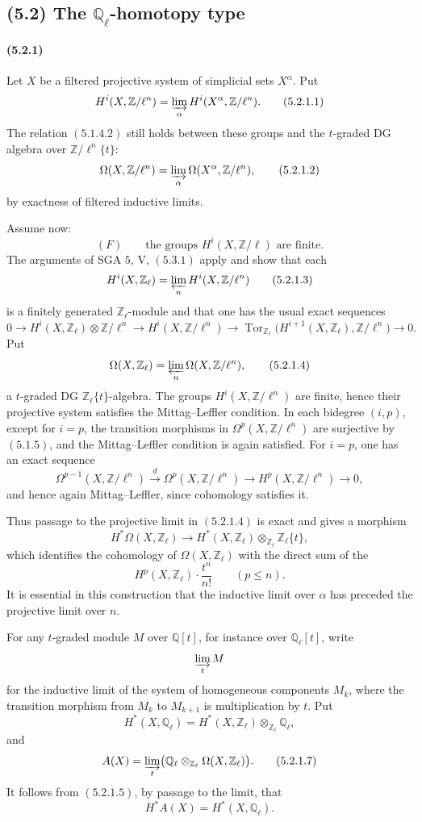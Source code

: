 \documentclass[11pt]{article}
\theoremstyle{remark}
\newcommand{\Ql}{\mathbb{Q}_\ell}
\newcommand{\ZZ}{\mathbb{Z}}
\newcommand{\QQ}{\mathbb{Q}}
\begin{document}
\subsection*{(5.2) The \(\mathbb Q_\ell\)-homotopy type}

\paragraph{(5.2.1)}
Let \(X\) be a filtered projective system of simplicial sets \(X^\alpha\).  Put
\[
H^i(X,\ZZ/\ell^n)=\varinjlim_\alpha H^i(X^\alpha,\ZZ/\ell^n). \tag{5.2.1.1}
\]
The relation \((5.1.4.2)\) still holds between these groups and the \(t\)-graded DG algebra over \(\ZZ/\ell^n\{t\}\):
\[
\Omega(X,\ZZ/\ell^n)=\varinjlim_\alpha \Omega(X^\alpha,\ZZ/\ell^n), \tag{5.2.1.2}
\]
by exactness of filtered inductive limits.

Assume now:
\[
(F)\qquad\text{the groups }H^i(X,\ZZ/\ell)\text{ are finite.}
\]
The arguments of SGA \(5\), V, \((5.3.1)\) apply and show that each
\[
H^i(X,\ZZ_\ell)=\varprojlim_n H^i(X,\ZZ/\ell^n) \tag{5.2.1.3}
\]
is a finitely generated \(\ZZ_\ell\)-module and that one has the usual exact sequences
\[
0\to H^i(X,\ZZ_\ell)\otimes\ZZ/\ell^n
\to H^i(X,\ZZ/\ell^n)
\to \operatorname{Tor}_{\ZZ_\ell}\bigl(H^{i+1}(X,\ZZ_\ell),\ZZ/\ell^n\bigr)\to 0.
\]
Put
\[
\Omega(X,\ZZ_\ell)=\varprojlim_n\Omega(X,\ZZ/\ell^n), \tag{5.2.1.4}
\]
a \(t\)-graded DG \(\ZZ_\ell\{t\}\)-algebra.  The groups \(H^i(X,\ZZ/\ell^n)\) are finite, hence their projective system satisfies the Mittag--Leffler condition.  In each bidegree \((i,p)\), except for \(i=p\), the transition morphisms in \(\Omega^p(X,\ZZ/\ell^n)\) are surjective by \((5.1.5)\), and the Mittag--Leffler condition is again satisfied.  For \(i=p\), one has an exact sequence
\[
\Omega^{p-1}(X,\ZZ/\ell^n)\xrightarrow{d}
\Omega^p(X,\ZZ/\ell^n)\longrightarrow H^p(X,\ZZ/\ell^n)\longrightarrow 0,
\]
and hence again Mittag--Leffler, since cohomology satisfies it.

Thus passage to the projective limit in \((5.2.1.4)\) is exact and gives a morphism
\[
H^*\Omega(X,\ZZ_\ell)\longrightarrow
H^*(X,\ZZ_\ell)\otimes_{\ZZ_\ell}\ZZ_\ell\{t\}, \tag{5.2.1.5}
\]
which identifies the cohomology of \(\Omega(X,\ZZ_\ell)\) with the direct sum of the
\[
H^p(X,\ZZ_\ell)\cdot \frac{t^n}{n!}
\qquad (p\le n).
\]
It is essential in this construction that the inductive limit over \(\alpha\) has preceded the projective limit over \(n\).

For any \(t\)-graded module \(M\) over \(\QQ[t]\), for instance over \(\Ql[t]\), write
\[
\varinjlim_t M
\]
for the inductive limit of the system of homogeneous components \(M_k\), where the transition morphism from \(M_k\) to \(M_{k+1}\) is multiplication by \(t\).  Put
\[
H^*(X,\Ql)=H^*(X,\ZZ_\ell)\otimes_{\ZZ_\ell}\Ql, \tag{5.2.1.6}
\]
and
\[
A(X)=\varinjlim_t\bigl(\Ql\otimes_{\ZZ_\ell}\Omega(X,\ZZ_\ell)\bigr). \tag{5.2.1.7}
\]
It follows from \((5.2.1.5)\), by passage to the limit, that
\[
H^*A(X)=H^*(X,\Ql). \tag{5.2.1.8}
\]
\end{document}
